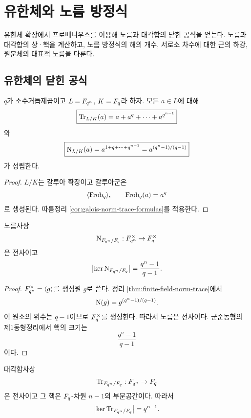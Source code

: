 \clearpage
\section{유한체와 노름 방정식}
\label{sec:finite-field-norm-trace}

\begin{learninggoal}
유한체 확장에서 프로베니우스를 이용해 노름과 대각합의 닫힌 공식을 얻는다. 노름과 대각합의 상·핵을 계산하고, 노름 방정식의 해의 개수, 서로소 차수에 대한 근의 하강, 원분체의 대표적 노름을 다룬다.
\end{learninggoal}

\subsection{유한체의 닫힌 공식}

\begin{theorem}
\label{thm:finite-field-norm-trace}
$q$가 소수거듭제곱이고 $L=F_{q^n}$, $K=F_q$라 하자.
모든 $a\in L$에 대해
\[
  \boxed{
  \operatorname{Tr}_{L/K}(a)
  =a+a^q+\cdots+a^{q^{n-1}}}
\]
와
\[
  \boxed{
  \operatorname{N}_{L/K}(a)
  =a^{1+q+\cdots+q^{n-1}}
  =a^{(q^n-1)/(q-1)}}
\]
가 성립한다.
\end{theorem}

\begin{proof}
$L/K$는 갈루아 확장이고 갈루아군은
\[
  \langle\operatorname{Frob}_q\rangle,\qquad
  \operatorname{Frob}_q(a)=a^q
\]
로 생성된다. 따름정리 \ref{cor:galois-norm-trace-formulas}를 적용한다.
\end{proof}

\begin{proposition}
\label{prop:finite-field-norm-surjective}
노름사상
\[
  \operatorname{N}_{F_{q^n}/F_q}:F_{q^n}^\times\to F_q^\times
\]
은 전사이고
\[
  \left|\ker\operatorname{N}_{F_{q^n}/F_q}\right|
  =\frac{q^n-1}{q-1}.
\]
\end{proposition}

\begin{proof}
$F_{q^n}^\times=\langle g\rangle$를 생성원 $g$로 쓴다. 정리
\ref{thm:finite-field-norm-trace}에서
\[
  \operatorname{N}(g)=g^{(q^n-1)/(q-1)}.
\]
이 원소의 위수는 $q-1$이므로 $F_q^\times$를 생성한다. 따라서 노름은
전사이다. 군준동형의 제1동형정리에서 핵의 크기는
\[
  \frac{q^n-1}{q-1}
\]
이다.
\end{proof}

\begin{proposition}
\label{prop:finite-field-trace-surjective}
대각합사상
\[
  \operatorname{Tr}_{F_{q^n}/F_q}:F_{q^n}\to F_q
\]
은 전사이고 그 핵은 $F_q$-차원 $n-1$의 부분공간이다. 따라서
\[
  \left|\ker\operatorname{Tr}_{F_{q^n}/F_q}\right|
  =q^{n-1}.
\]
\end{proposition}

